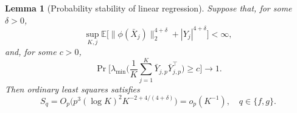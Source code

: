 \documentclass[12pt]{article}
\def\E{\mathbb{E}}
\newtheorem{lemma}[theorem]{Lemma}
\numberwithin{equation}{section}
\begin{document}
\begin{lemma}[Probability stability of linear regression]
\label{lem:linear-regression-stability}
Suppose that, for some $\delta>0$,
\begin{equation}
\label{eq:linear-moment}
\sup_{K,j}
\E\big[
\|\phi(\bar X_j)\|_2^{4+\delta}
+|Y_j|^{4+\delta}
\big]<\infty,
\end{equation}
and, for some $c>0$,
\begin{equation}
\label{eq:linear-gram}
\Pr\Big[
\lambda_{\min}\big(
\frac1K\sum_{j=1}^K
\bar Y_{j,p}\bar Y_{j,p}^\top
\big)\geq c
\Big]\rightarrow1.
\end{equation}
Then ordinary least squares satisfies
\[
S_q
=
O_p\big(
p^3(\log K)^2K^{-2+4/(4+\delta)}
\big)
=o_p(K^{-1}),
\quad q\in\{f,g\}.
\]
\end{lemma}
\end{document}
